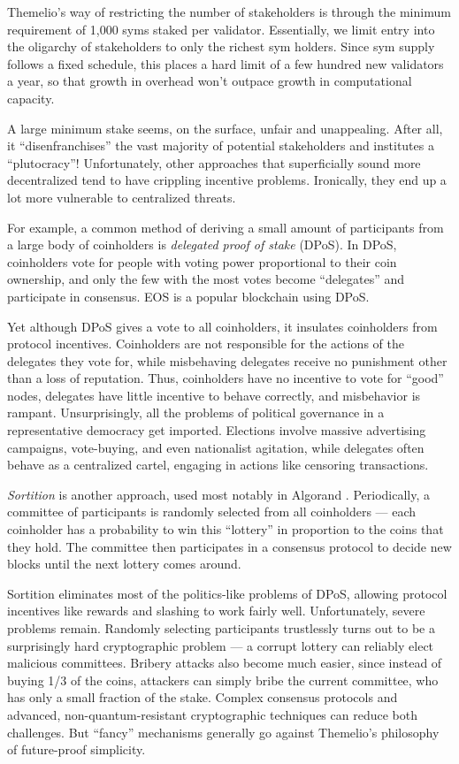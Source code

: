 \documentclass[headinclude,12pt]{scrbook}
\begin{document}
Themelio's way of restricting the number of stakeholders is through the
minimum requirement of 1,000 syms staked per validator. Essentially, we
limit entry into the oligarchy of stakeholders to only the richest sym
holders. Since sym supply follows a fixed schedule, this places a hard
limit of a few hundred new validators a year, so that growth in overhead
won't outpace growth in computational capacity.

A large minimum stake seems, on the surface, unfair and unappealing.
After all, it ``disenfranchises'' the vast majority of potential
stakeholders and institutes a ``plutocracy''! Unfortunately, other
approaches that superficially sound more decentralized tend to have
crippling incentive problems. Ironically, they end up a lot more
vulnerable to centralized threats.

For example, a common method of deriving a small amount of participants
from a large body of coinholders is \emph{delegated proof of stake}
(DPoS). In DPoS, coinholders vote for people with voting power
proportional to their coin ownership, and only the few with the most
votes become ``delegates'' and participate in consensus. EOS is a
popular blockchain using DPoS.

Yet although DPoS gives a vote to all coinholders, it insulates
coinholders from protocol incentives. Coinholders are not responsible
for the actions of the delegates they vote for, while misbehaving
delegates receive no punishment other than a loss of reputation. Thus,
coinholders have no incentive to vote for ``good'' nodes, delegates have
little incentive to behave correctly, and misbehavior is rampant.
Unsurprisingly, all the problems of political governance in a
representative democracy get imported. Elections involve massive
advertising campaigns, vote-buying, and even nationalist agitation\cite{zhihu2019votebuy}, while delegates often behave as a centralized
cartel, engaging in actions like censoring transactions\cite{eoscensor}.

\emph{Sortition} is another approach, used most notably in Algorand
\cite{gilad2017algorand}. Periodically, a committee of participants is
randomly selected from all coinholders --- each coinholder has a
probability to win this ``lottery'' in proportion to the coins that they
hold. The committee then participates in a consensus protocol to decide
new blocks until the next lottery comes around.

Sortition eliminates most of the politics-like problems of DPoS,
allowing protocol incentives like rewards and slashing to work fairly
well. Unfortunately, severe problems remain. Randomly selecting
participants trustlessly turns out to be a surprisingly hard
cryptographic problem --- a corrupt lottery can reliably elect malicious
committees. Bribery attacks also become much easier, since instead of
buying 1/3 of the coins, attackers can simply bribe the current
committee, who has only a small fraction of the stake. Complex consensus
protocols and advanced, non-quantum-resistant cryptographic techniques
can reduce both challenges. But ``fancy'' mechanisms generally go
against Themelio's philosophy of future-proof simplicity.
\end{document}

